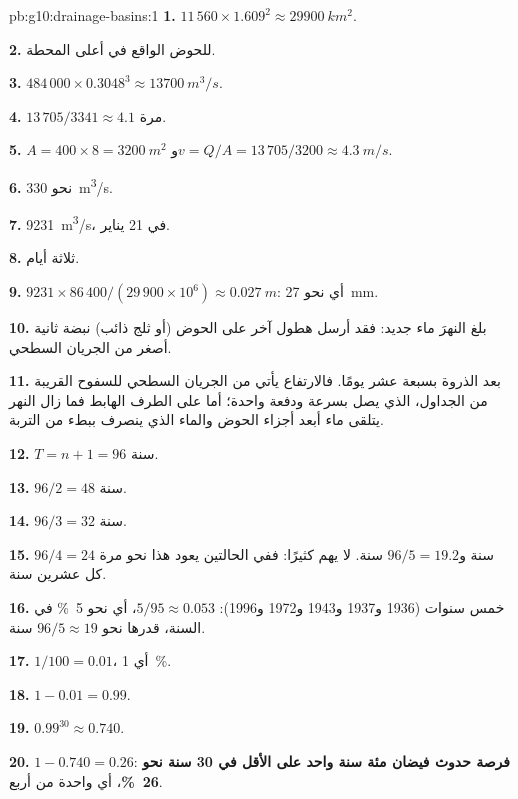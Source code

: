 \begin{solution}{pb:g10:drainage-basins:1}
\textbf{1.} $11\,560 \times 1.609^2 \approx \qty{29900}{km^2}$.

\textbf{2.}  للحوض الواقع في أعلى المحطة.

\textbf{3.} $484\,000 \times 0.3048^3 \approx \qty{13700}{m^3/s}$.

\textbf{4.} $13\,705/3341 \approx 4.1$ مرة.

\textbf{5.} $A = 400 \times 8 = \qty{3200}{m^2}$ و$v = Q/A = 13\,705/3200
\approx \qty{4.3}{m/s}$.

\textbf{6.} نحو \qty{330}{m^3/s}.

\textbf{7.} \qty{9231}{m^3/s}، في 21 يناير.

\textbf{8.} ثلاثة أيام.

\textbf{9.} $9231 \times 86\,400/(29\,900 \times 10^6) \approx
\qty{0.027}{m}$: أي نحو \qty{27}{mm}.

\textbf{10.} بلغ النهرَ ماء جديد: فقد أرسل هطول آخر على الحوض (أو ثلج ذائب)
نبضة ثانية أصغر من الجريان السطحي.

\textbf{11.} بعد الذروة بسبعة عشر يومًا. فالارتفاع يأتي من الجريان السطحي للسفوح
القريبة من الجداول، الذي يصل بسرعة ودفعة واحدة؛ أما على الطرف الهابط فما زال النهر
يتلقى ماء أبعد أجزاء الحوض والماء الذي ينصرف ببطء من التربة.

\textbf{12.} $T = n + 1 = 96$ سنة.

\textbf{13.} $96/2 = 48$ سنة.

\textbf{14.} $96/3 = 32$ سنة.

\textbf{15.} $96/4 = 24$ سنة و$96/5 = 19.2$ سنة. لا يهم كثيرًا: ففي الحالتين
يعود هذا  نحو مرة كل عشرين سنة.

\textbf{16.} خمس سنوات (1936 و1937 و1943 و1972 و1996): $5/95 \approx
0.053$، أي نحو \qty{5}{\percent} في السنة،  قدرها نحو
$96/5 \approx 19$ سنة.

\textbf{17.} $1/100 = 0.01$، أي \qty{1}{\percent}.

\textbf{18.} $1 - 0.01 = 0.99$.

\textbf{19.} $0.99^{30} \approx 0.740$.

\textbf{20.} $1 - 0.740 = 0.26$: \textbf{فرصة حدوث فيضان مئة سنة واحد على الأقل
في 30 سنة نحو \qty{26}{\percent}}، أي واحدة من أربع.
\end{solution}
